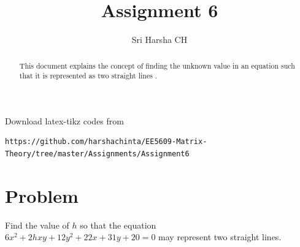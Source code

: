 \documentclass[journal,12pt,twocolumn]{IEEEtran}
\begin{document}
\renewcommand{\thefigure}{\theproblem}

\def\putbox#1#2#3{\makebox[0in][l]{\makebox[#1][l]{}\raisebox{\baselineskip}[0in][0in]{\raisebox{#2}[0in][0in]{#3}}}}
     \def\rightbox#1{\makebox[0in][r]{#1}}
     \def\centbox#1{\makebox[0in]{#1}}
     \def\topbox#1{\raisebox{-\baselineskip}[0in][0in]{#1}}
     \def\midbox#1{\raisebox{-0.5\baselineskip}[0in][0in]{#1}}
\vspace{3cm}
\title{Assignment 6}
\author{Sri Harsha CH}

\maketitle
\newpage

\bigskip
\renewcommand{\thefigure}{\theenumi}
\renewcommand{\thetable}{\theenumi}

\begin{abstract}
This document explains the concept of finding the unknown value in an equation such that it is represented as two straight lines .
\end{abstract}

%
Download latex-tikz codes from 
%
\begin{lstlisting}
https://github.com/harshachinta/EE5609-Matrix-Theory/tree/master/Assignments/Assignment6
\end{lstlisting}
%
\section{Problem}
Find the value of $h$ so that the equation \\$6x^2+2hxy+12y^2+22x+31y+20=0$ may represent two straight lines.
\end{document}
